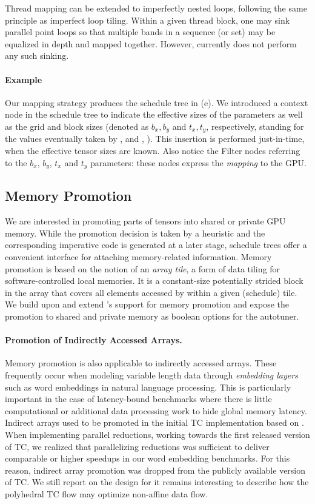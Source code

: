 Thread mapping can be extended to imperfectly nested loops, following
the same principle as imperfect loop tiling. Within a given thread
block, one may sink parallel point loops so that multiple bands in a
sequence (or set) may be equalized in depth and mapped together.
However, \ourtoolkitname currently does not perform any such sinking.

\paragraph{Example}
Our mapping strategy produces the schedule tree in (e).
We introduced a context node in the schedule tree to indicate the effective
sizes of the parameters as well as the grid and block sizes (denoted as $b_x,
b_y$ and $t_x, t_y$, respectively, standing for the values eventually taken by
,  and , ).
This insertion is performed just-in-time, when the effective tensor sizes are
known.
Also notice the Filter nodes referring to the $b_x$, $b_y$, $t_x$ and
$t_y$ parameters: these nodes express the \emph{mapping} to the GPU.

\subsection{Memory Promotion}\label{sec:memory-promotion}
We are interested in promoting parts of tensors into shared or private
GPU memory.  While the promotion decision is taken by a heuristic and
the corresponding imperative code is generated at a later stage,
schedule trees offer a convenient interface for attaching
memory-related information.  Memory promotion is based on the notion
of an \emph{array tile}, a form of data tiling for software-controlled
local memories.
It is a constant-size potentially strided block in the array that covers all
elements accessed by within a given (schedule) tile.
We build upon and extend \ppcg's support for memory promotion
\cite{PPCG2013,Verdoolaege2017scheduler} and expose the promotion to shared and
private memory as boolean options for the autotuner.

\paragraph{Promotion of Indirectly Accessed Arrays.}
Memory promotion is also applicable to indirectly accessed arrays.
These frequently occur when modeling variable length data through
\emph{embedding layers} such as word embeddings in natural language
processing.  This is particularly important in the case of
latency-bound benchmarks where there is little computational or
additional data processing work to hide global memory
latency. Indirect arrays used to be promoted in the initial TC
implementation based on \ppcg.  When implementing parallel reductions,
working towards the first released version of TC, we
realized that parallelizing reductions was sufficient to deliver
comparable or higher speedups in our word embedding benchmarks. For
this reason, indirect array promotion was dropped from the publicly
available version of TC. We still report on the design for it remains
interesting to describe how the polyhedral TC flow may optimize
non-affine data flow.

